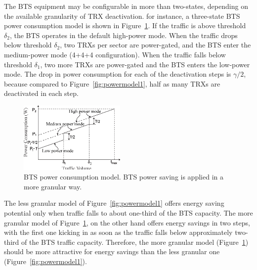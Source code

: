 The BTS equipment may be configurable in more than two-states, depending on the available granularity of TRX deactivation. for instance, a three-state BTS power consumption model is shown in Figure~\ref{fig:powermodel2}. If the traffic is above threshold $\delta_2$, the BTS operates in the default high-power mode. When the traffic drops below threshold $\delta_2$, two TRXs per sector are power-gated, and the BTS enter the medium-power mode (4+4+4 configuration). When the traffic falls below threshold $\delta_1$, two more TRXs are power-gated and the BTS enters the low-power mode. The drop in power consumption for each of the deactivation steps is $\gamma/2$, because compared to Figure~\ref{fig:powermodel1}, half as many TRXs are deactivated in each step.

\begin{figure}
\centering
\includegraphics[width=0.46\textwidth]{figures/powermodel2-1.eps}
\caption{BTS power consumption model. BTS power saving is applied in a more granular way.}
\label{fig:powermodel2}
\end{figure}

The less granular model of Figure~\ref{fig:powermodel1} offers energy saving potential only when traffic falls to about one-third of the BTS capacity. The more granular model of Figure~\ref{fig:powermodel2}, on the other hand offers energy savings in two steps, with the first one kicking in as soon as the traffic falls below approximately two-third of the BTS traffic capacity. Therefore, the more granular model (Figure~\ref{fig:powermodel2}) should be more attractive for energy savings than the less granular one (Figure~\ref{fig:powermodel1}).

